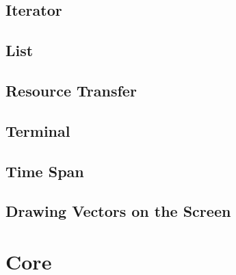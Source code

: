 		\subsection{Iterator}
		\subsection{List}
		\subsection{Resource Transfer}
		\subsection{Terminal}
		\subsection{Time Span}
		\subsection{Drawing Vectors on the Screen}
	\section{Core}